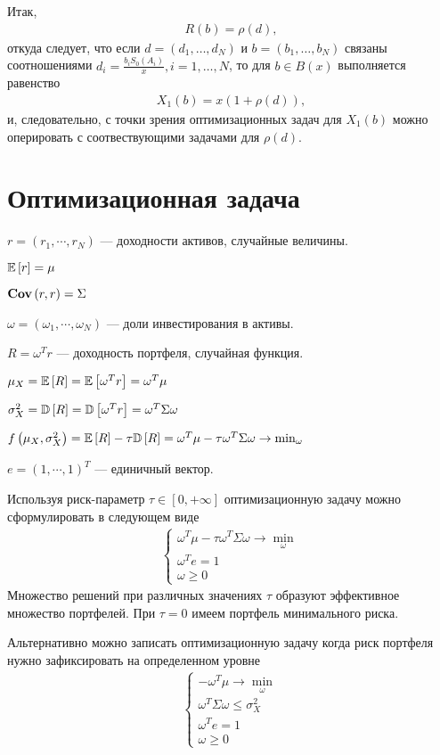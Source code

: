 Итак,
\begin{align}
R(b) = \rho(d),
\end{align}
откуда следует, что если $d = (d_1, \dots, d_N)$ и $b = (b_1, \dots, b_N)$ связаны соотношениями 
$d_i = \frac{b_i S_0(A_i)}{x}, i=1, \dots, N$, то для $b \in B(x)$ выполняется равенство
\begin{align}
X_1(b) = x(1 + \rho(d)),
\end{align}
и, следовательно, с точки зрения оптимизационных задач для $X_1(b)$ можно оперировать с соотвествующими задачами
для $\rho(d)$.

\section{Оптимизационная задача}

$r = (r_1, \cdots, r_N)$ --- доходности активов, случайные величины.

$\mathbb{E}\left[r\right] = \mu$

$\textbf{Cov}\left(r, r\right) = \Sigma$

$\omega = (\omega_1, \cdots, \omega_N)$ --- доли инвестирования в активы.

$R = \omega^T r$ --- доходность портфеля, случайная функция.

$\mu_X = \mathbb{E}\left[R\right] = \mathbb{E}\left[\omega^T r\right] = \omega^T \mu$

$\sigma_X^2 = \mathbb{D}\left[R\right] = \mathbb{D}\left[\omega^T r\right] = \omega^T \Sigma \omega$

$f\left(\mu_X, \sigma_X^2 \right) = \mathbb{E}\left[R\right] - \tau \mathbb{D}\left[R\right] = \omega^T \mu - \tau \omega^T \Sigma \omega
\rightarrow \min_{\omega}
$

$e = (1, \cdots, 1)^T$ --- единичный вектор.

Используя риск-параметр $\tau \in [0, +\infty]$ оптимизационную задачу можно сформулировать в следующем виде
\begin{align}
	\begin{cases}
		\omega^T \mu - \tau \omega^T \Sigma \omega \rightarrow \min_{\omega} \\
		\omega^T e = 1 \\
		\omega \ge 0
	\end{cases}
\end{align}
Множество решений при различных значениях $\tau$ образуют эффективное множество портфелей.
При $\tau = 0$ имеем портфель минимального риска.

Альтернативно можно записать оптимизационную задачу когда риск портфеля нужно зафиксировать на определенном уровне
\begin{align}
	\begin{cases}
		-\omega^T \mu \rightarrow \min_{\omega} \\
		\omega^T \Sigma \omega \le \sigma_X^2 \\
		\omega^T e = 1 \\
		\omega \ge 0
	\end{cases}
\end{align}

